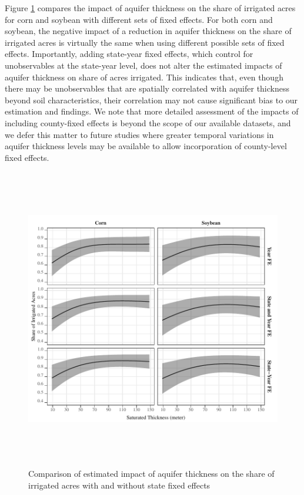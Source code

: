 \documentclass[
]{article}
\begin{document}
Figure \ref{fig:state-fe-with-without} compares the impact of aquifer thickness on the share of irrigated acres for corn and soybean with different sets of fixed effects. For both corn and soybean, the negative impact of a reduction in aquifer thickness on the share of irrigated acres is virtually the same when using different possible sets of fixed effects. Importantly, adding state-year fixed effects, which control for unobservables at the state-year level, does not alter the estimated impacts of aquifer thickness on share of acres irrigated. This indicates that, even though there may be unobservables that are spatially correlated with aquifer thickness beyond soil characteristics, their correlation may not cause significant bias to our estimation and findings. We note that more detailed assessment of the impacts of including county-fixed effects is beyond the scope of our available datasets, and we defer this matter to future studies where greater temporal variations in aquifer thickness levels may be available to allow incorporation of county-level fixed effects.

\begin{figure}[H]

{\centering \includegraphics[width=6in,height=500px,]{../../Figures/g_share_comp} 

}

\caption{Comparison of estimated impact of aquifer thickness on the share of irrigated acres with and without state fixed effects}\label{fig:state-fe-with-without}
\end{figure}
\end{document}
